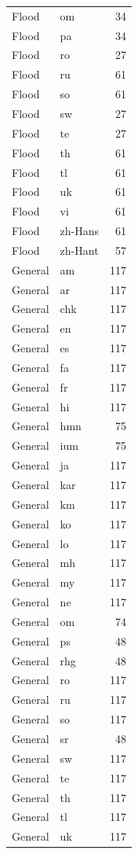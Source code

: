 \begin{longtable}{p{3cm} p{3cm} r}
Flood & om & 34 \\
Flood & pa & 34 \\
Flood & ro & 27 \\
Flood & ru & 61 \\
Flood & so & 61 \\
Flood & sw & 27 \\
Flood & te & 27 \\
Flood & th & 61 \\
Flood & tl & 61 \\
Flood & uk & 61 \\
Flood & vi & 61 \\
Flood & zh-Hans & 61 \\
Flood & zh-Hant & 57 \\
General & am & 117 \\
General & ar & 117 \\
General & chk & 117 \\
General & en & 117 \\
General & es & 117 \\
General & fa & 117 \\
General & fr & 117 \\
General & hi & 117 \\
General & hmn & 75 \\
General & ium & 75 \\
General & ja & 117 \\
General & kar & 117 \\
General & km & 117 \\
General & ko & 117 \\
General & lo & 117 \\
General & mh & 117 \\
General & my & 117 \\
General & ne & 117 \\
General & om & 74 \\
General & ps & 48 \\
General & rhg & 48 \\
General & ro & 117 \\
General & ru & 117 \\
General & so & 117 \\
General & sr & 48 \\
General & sw & 117 \\
General & te & 117 \\
General & th & 117 \\
General & tl & 117 \\
General & uk & 117 \\

\end{longtable}
